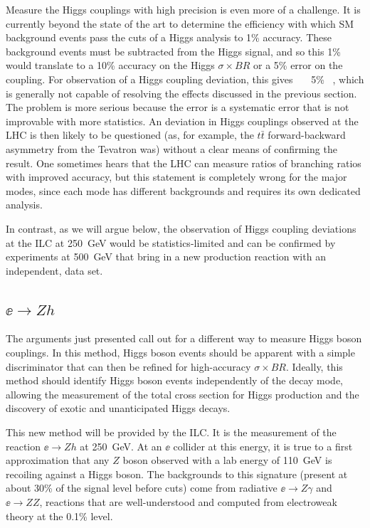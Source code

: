 Measure the Higgs couplings with high precision is even more of a challenge.   It is currently beyond the state of the art to determine the efficiency  with which SM background events pass the cuts of a Higgs analysis to 1\% accuracy.   These background events must be subtracted from the Higgs signal, and so this 1\% would translate to a 10\% accuracy on the Higgs $\sigma\times BR$ or a 5\% error on the coupling.  For observation of a Higgs coupling deviation, this gives
\ \sigma \ \times  \ 5\% \ ,
\eeqn
which is generally not capable of resolving the effects discussed in the previous section.  The problem is more serious because the error is a systematic error that is not improvable with more statistics.   An deviation in Higgs couplings observed at the LHC is then likely to be questioned (as, for example, the $t\bar t$ forward-backward asymmetry from the Tevatron was) without a clear means of confirming the result. 
One sometimes hears that the LHC can measure ratios of branching ratios with improved accuracy, but this statement is completely wrong for the major modes, since each mode has different backgrounds and requires its own dedicated analysis. 

 In contrast, as we will argue below, the observation of Higgs coupling deviations at the ILC at  250~GeV would be statistics-limited and can be confirmed by experiments at 500~GeV that bring in a new production reaction with an independent, data set. 


\subsection{$\ee\to Zh$}

The arguments just presented call out for a different way to measure Higgs boson couplings.   In this method, Higgs boson events should be apparent with a simple discriminator that can then be refined for high-accuracy $\sigma\times BR$.  Ideally, this method should identify Higgs boson events independently of the decay mode, allowing the measurement of the total cross section for Higgs production and the discovery of exotic and unanticipated Higgs decays.

This new method will be provided by the ILC.  It is the measurement of the reaction $\ee\to Zh$ at 250~GeV.   At an $\ee$ collider at this energy, it is true to a first approximation that any $Z$ boson observed with a lab energy of  110~GeV is recoiling against a Higgs boson.   The backgrounds to this signature (present at about 30\% of the signal level before cuts)  come from radiative $\ee\to Z\gamma$ and $\ee\to ZZ$, reactions that are well-understood and computed from electroweak theory at the 0.1\% level. 


